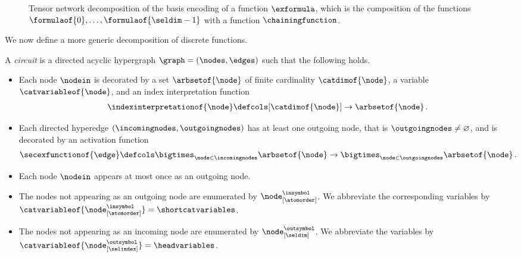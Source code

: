 \begin{figure}[t]
    \begin{center}
        
    \end{center}
    \caption{Tensor network decomposition of the basis encoding of a function $\exformula$, which is the composition of the functions $\formulaof{0},\ldots,\formulaof{\seldim-1}$ with a function $\chainingfunction$.}
    \label{fig:functionDecomposition}
\end{figure}

We now define a more generic decomposition of discrete functions.

\begin{definition}
    \label{def:circuit}
    A \emph{circuit} is a directed acyclic hypergraph $\graph=(\nodes,\edges)$ such that the following holds.
    \begin{itemize}
        \item Each node $\nodein$ is decorated by a set $\arbsetof{\node}$ of finite cardinality $\catdimof{\node}$, a variable $\catvariableof{\node}$, and an index interpretation function
        \begin{align*}
            \indexinterpretationof{\node} \defcols [\catdimof{\node}] \rightarrow \arbsetof{\node} \, .
        \end{align*}
        \item Each directed hyperedge $(\incomingnodes,\outgoingnodes)$ has at least one outgoing node, that is $\outgoingnodes\neq\varnothing$, and is decorated by an activation function %
        \begin{align*}
            \secexfunctionof{\edge} \defcols
            \bigtimes_{\node\in\incomingnodes} \arbsetof{\node}
            \rightarrow \bigtimes_{\node\in\outgoingnodes} \arbsetof{\node} \, .
        \end{align*}
        \item Each node $\nodein$ appears at most once as an outgoing node. %
        \item The nodes not appearing as an outgoing node are enumerated by $\node^{\insymbol}_{[\atomorder]}$.
        We abbreviate the corresponding variables by $\catvariableof{\node^{\insymbol}_{[\atomorder]}}=\shortcatvariables$. %
        \item The nodes not appearing as an incoming node are enumerated by $\node^{\outsymbol}_{[\seldim]}$.
        We abbreviate the variables by $\catvariableof{\node^{\outsymbol}_{[\selindex]}}=\headvariables$. %

\end{itemize}
\end{definition}
